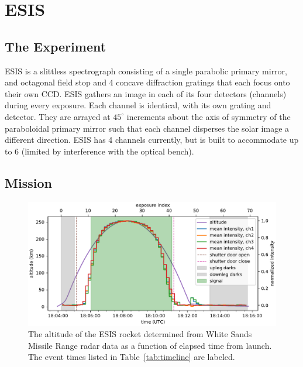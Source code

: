 {\section{ESIS}

    
	\subsection{The Experiment}
	  	ESIS is a slittless spectrograph consisting of a single parabolic primary mirror, and octagonal field stop and 4 concave diffraction gratings that each focus onto their own CCD.
		ESIS gathers an image in each of its four detectors (channels) during every exposure.  
		Each channel is identical, with its own grating and detector. 
		They are arrayed at $45^{\circ}$ increments about the axis of symmetry of the paraboloidal primary mirror such that each channel disperses the solar image a different direction. ESIS has 4 channels currently, but is built to accommodate up to 6 (limited by interference with the optical bench).
		

    
	\subsection{Mission} 




		\begin{figure}[ht]
			\begin{center}
				\includegraphics{figures/signal_and_altitude_vs_time}
				\caption{The altitude of the ESIS rocket determined from White Sands Missile Range radar data as a function of elapsed time from launch.  The event times listed in Table~\ref{tab:timeline} are labeled.}
				\label{fig:timeline}
			\end{center}
		\end{figure}


}
